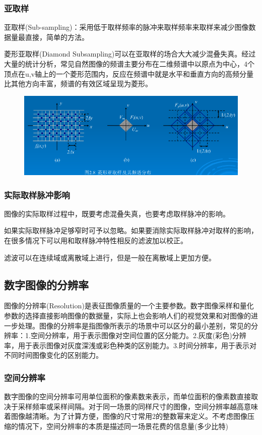 \documentclass[11pt]{article}
\begin{document}
\subsubsection{亚取样}
亚取样(Sub-sampling)：采用低于取样频率的脉冲来取样频率来取样来减少图像数据量最直接，简单的方法。

菱形亚取样(Diamond Subsampling)可以在亚取样的场合大大减少混叠失真。经过大量的统计分析，常见自然图像的频谱主要分布在二维频谱中以原点为中心，4个顶点在u,v轴上的一个菱形范围内，反应在频谱中就是水平和垂直方向的高频分量比其他方向丰富，频谱的有效区域呈现为菱形。

\begin{figure}[h]
	\centering
	\includegraphics[scale = 0.5]{13}
\end{figure}

\subsubsection{实际取样脉冲影响}
图像的实际取样过程中，既要考虑混叠失真，也要考虑取样脉冲的影响。

如果实际取样脉冲足够窄时可予以忽略。如果要消除实际取样脉冲对取样的影响，在很多情况下可以用和取样脉冲特性相反的滤波加以校正。

滤波可以在连续域或离散域上进行，但是一般在离散域上更加方便。

\subsection{数字图像的分辨率}

图像的分辨率(Resolution)是表征图像质量的一个主要参数。数字图像采样和量化参数的选择直接影响图像的数据量，实际上也会影响人们的视觉效果和对图像的进一步处理。图像的分辨率是指图像所表示的场景中可以区分的最小差别，常见的分辨率：1.空间分辨率，用于表示图像对空间位置的区分能力。2.灰度(彩色)分辨率，用于表示图像对灰度深浅或彩色种类的区别能力。3.时间分辨率，用于表示对不同时间图像变化的区别能力。
\subsubsection{空间分辨率}
数字图像的空间分辨率可用单位面积的像素数来表示，而单位面积的像素数直接取决于采样频率或采样间隔。对于同一场景的同样尺寸的图像，空间分辨率越高意味着图像越清晰。为了计算方便，图像的尺寸常用2的整数幂来定义。不考虑图像压缩的情况下，空间分辨率的本质是描述同一场景花费的信息量(多少比特)
\end{document}
